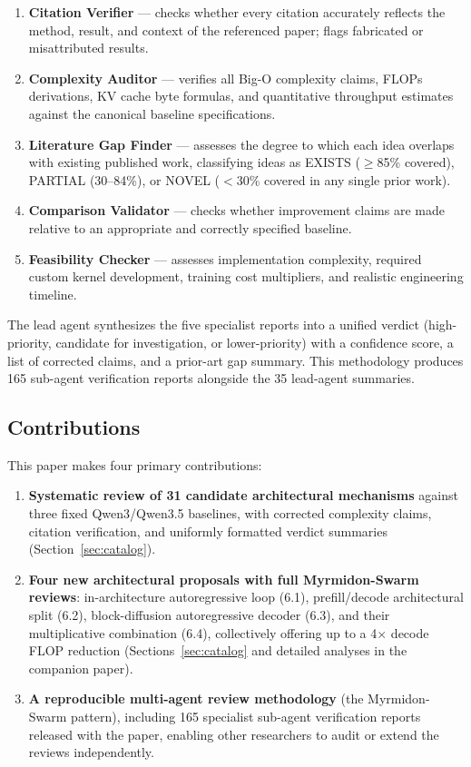 \documentclass[11pt]{article}
\begin{document}
\begin{enumerate}
\item \textbf{Citation Verifier} --- checks whether every citation accurately reflects the method, result, and context of the referenced paper; flags fabricated or misattributed results.
\item \textbf{Complexity Auditor} --- verifies all Big-O complexity claims, FLOPs derivations, KV cache byte formulas, and quantitative throughput estimates against the canonical baseline specifications.
\item \textbf{Literature Gap Finder} --- assesses the degree to which each idea overlaps with existing published work, classifying ideas as EXISTS ($\geq$85\% covered), PARTIAL (30--84\%), or NOVEL ($<$30\% covered in any single prior work).
\item \textbf{Comparison Validator} --- checks whether improvement claims are made relative to an appropriate and correctly specified baseline.
\item \textbf{Feasibility Checker} --- assesses implementation complexity, required custom kernel development, training cost multipliers, and realistic engineering timeline.
\end{enumerate}

The lead agent synthesizes the five specialist reports into a unified verdict (high-priority, candidate for investigation, or lower-priority) with a confidence score, a list of corrected claims, and a prior-art gap summary.
This methodology produces 165 sub-agent verification reports alongside the 35 lead-agent summaries.

\subsection*{Contributions}

This paper makes four primary contributions:

\begin{enumerate}
\item \textbf{Systematic review of 31 candidate architectural mechanisms} against three fixed Qwen3/Qwen3.5 baselines, with corrected complexity claims, citation verification, and uniformly formatted verdict summaries (Section~\ref{sec:catalog}).

\item \textbf{Four new architectural proposals with full Myrmidon-Swarm reviews}: in-architecture autoregressive loop (6.1), prefill/decode architectural split (6.2), block-diffusion autoregressive decoder (6.3), and their multiplicative combination (6.4), collectively offering up to a 4$\times$ decode FLOP reduction (Sections~\ref{sec:catalog} and detailed analyses in the companion paper).


\item \textbf{A reproducible multi-agent review methodology} (the Myrmidon-Swarm pattern), including 165 specialist sub-agent verification reports released with the paper, enabling other researchers to audit or extend the reviews independently.
\end{enumerate}
\end{document}
